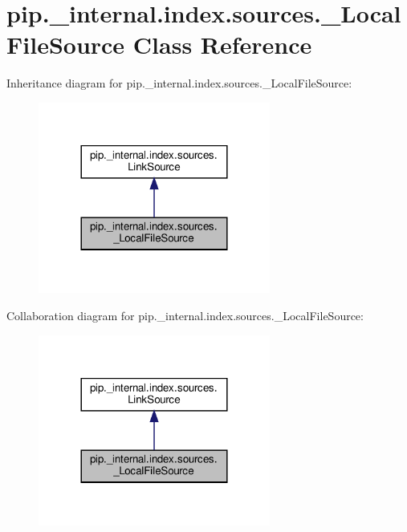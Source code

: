 \hypertarget{classpip_1_1__internal_1_1index_1_1sources_1_1__LocalFileSource}{}\section{pip.\+\_\+internal.\+index.\+sources.\+\_\+\+Local\+File\+Source Class Reference}
\label{classpip_1_1__internal_1_1index_1_1sources_1_1__LocalFileSource}


Inheritance diagram for pip.\+\_\+internal.\+index.\+sources.\+\_\+\+Local\+File\+Source\+:
\nopagebreak
\begin{figure}[H]
\begin{center}
\leavevmode
\includegraphics[width=216pt]{classpip_1_1__internal_1_1index_1_1sources_1_1__LocalFileSource__inherit__graph}
\end{center}
\end{figure}


Collaboration diagram for pip.\+\_\+internal.\+index.\+sources.\+\_\+\+Local\+File\+Source\+:
\nopagebreak
\begin{figure}[H]
\begin{center}
\leavevmode
\includegraphics[width=216pt]{classpip_1_1__internal_1_1index_1_1sources_1_1__LocalFileSource__coll__graph}
\end{center}
\end{figure}
